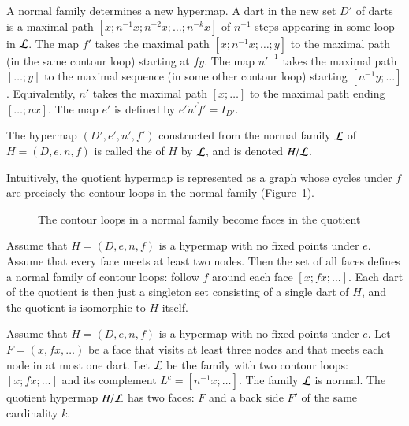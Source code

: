A normal family determines a new hypermap.  A dart in the new set $D'$
of darts is a maximal path $[x;n^{-1} x; n^{-2} x;\ldots;n^{-k}
x]$ of $n^{-1}$ steps appearing in some loop in $\cal L$. The map $f'$
takes the maximal path $[x;n^{-1}x;\ldots;y]$ to the maximal path (in
the same contour loop) starting at $f y$. The map ${n'}^{-1}$ takes
the maximal path $[\ldots;y]$ to the maximal sequence (in some other
contour loop) starting $[n^{-1}y;\ldots]$. Equivalently, $n'$ takes
the maximal path $[x;\ldots]$ to the maximal path ending $[\ldots;n
x]$. The map $e'$ is defined by $e'\ocirc n'\ocirc f' = I_{D'}$.
%

\begin{definition}[quotient] The hypermap $(D',e',n',f')$
constructed from the normal
family $\cal L$ of $H=(D,e,n,f)$ 
is called the  of $H$ by $\cal L$, and is denoted
$H/{\cal L}$.  
%
\end{definition}
%
%
%
%

Intuitively, the quotient hypermap is represented as a graph whose
cycles under $f$ are precisely the contour loops in the normal family
(Figure~\ref{fig:quot}).


\begin{figure}[htb]
\centering
{}
\caption{The contour loops in a normal family become faces in the
quotient}
\label{fig:quot}
\end{figure}


\begin{example}\label{ex:Hall} 
Assume that $H=(D,e,n,f)$ is a hypermap with no fixed points under $e$. Assume
that every face meets at least two nodes. Then the set of all faces
defines a normal family of contour loops: follow $f$ around each
face $[x;f x;\ldots]$.  Each dart of the quotient is then just a
singleton set consisting of a single dart of $H$, and the quotient
is isomorphic to $H$ itself.
\end{example}

\begin{example}\label{ex:H2} 
Assume that $H=(D,e,n,f)$ is a hypermap with no fixed points
under $e$.  Let $F = (x,f x,\ldots)$ be a face 
that visits at least
three nodes and that meets each node in at most one dart.
Let $\cal L$ be the
family with two contour loops:  $[x;f x;\ldots]$ and its
complement $L^c = [n^{-1} x;\ldots]$.
The family $\cal L$ is normal. The quotient hypermap $H/{\cal L}$ has
two faces: $F$ and a back side $F'$ of the same cardinality $k$.
%
\end{example}





